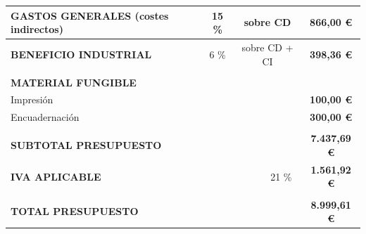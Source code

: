 \begin{table}[H]
{\begin{tabular}{lllllc}
\multicolumn{1}{|l|}{\textbf{GASTOS GENERALES (costes indirectos)}} & 
\multicolumn{1}{c|}{15 \%} & 
\multicolumn{3}{c|}{sobre CD} & 
\multicolumn{1}{c|}{\textbf{866,00 \euro}} \\ 
\hline

\multicolumn{1}{|l|}{\textbf{BENEFICIO INDUSTRIAL}} & 
\multicolumn{1}{c|}{6 \%} & 
\multicolumn{3}{c|}{sobre CD + CI} &
\multicolumn{1}{c|}{\textbf{398,36 \euro}} \\ 
\hline

& & & & & 
\multicolumn{1}{l}{} \\

\multicolumn{6}{l}{\textbf{MATERIAL FUNGIBLE}} \\
\hline 

\multicolumn{5}{|l|}{Impresión} & 
\multicolumn{1}{c|}{\textbf{100,00 \euro}} \\ 
\hline 

\multicolumn{5}{|l|}{Encuadernación} & 
\multicolumn{1}{c|}{\textbf{300,00 \euro}} \\ 
\hline

& & & & & 
\multicolumn{1}{l}{} \\
\hline

\multicolumn{5}{|l|}{\textbf{SUBTOTAL PRESUPUESTO}} & 
\multicolumn{1}{c|}{\textbf{7.437,69 \euro}} \\ 
\hline

\multicolumn{4}{|l|}{\textbf{IVA APLICABLE}} & 
\multicolumn{1}{c|}{21 \%} & 
\multicolumn{1}{c|}{\textbf{1.561,92 \euro}} \\ 
\hline

& & & & &
\multicolumn{1}{l}{} \\ 
\hline

\multicolumn{5}{|l|}{\textbf{TOTAL PRESUPUESTO}} & 
\multicolumn{1}{c|}{\textbf{8.999,61 \euro}} \\ 
\hline

\end{tabular}}
\end{table}